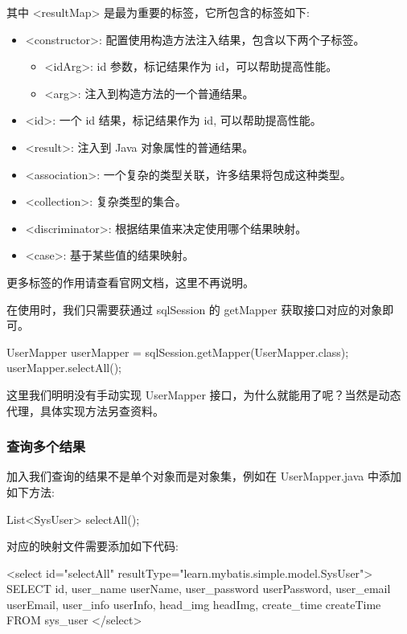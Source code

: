 其中 <resultMap> 是最为重要的标签，它所包含的标签如下:
\begin{itemize}
    \item <constructor>: 配置使用构造方法注入结果，包含以下两个子标签。
    \begin{itemize}
        \item <idArg>: id 参数，标记结果作为 id，可以帮助提高性能。
        \item <arg>: 注入到构造方法的一个普通结果。
    \end{itemize}
    \item <id>: 一个 id 结果，标记结果作为 id, 可以帮助提高性能。
    \item <result>: 注入到 Java 对象属性的普通结果。
    \item <association>: 一个复杂的类型关联，许多结果将包成这种类型。
    \item <collection>: 复杂类型的集合。
    \item <discriminator>: 根据结果值来决定使用哪个结果映射。
    \item <case>: 基于某些值的结果映射。
\end{itemize}

更多标签的作用请查看官网文档，这里不再说明。

在使用时，我们只需要获通过 sqlSession 的 getMapper 获取接口对应的对象即可。

\begin{Java}
UserMapper userMapper = sqlSession.getMapper(UserMapper.class);
userMapper.selectAll();
\end{Java}

这里我们明明没有手动实现 UserMapper 接口，为什么就能用了呢？当然是动态代理，具体实现方法另查资料。

\subsubsection*{查询多个结果}

加入我们查询的结果不是单个对象而是对象集，例如在 UserMapper.java 中添加如下方法:

\begin{Java}
List<SysUser> selectAll();
\end{Java}

对应的映射文件需要添加如下代码:

\begin{xml}
<select id="selectAll" resultType="learn.mybatis.simple.model.SysUser">
    SELECT id,
           user_name     userName,
           user_password userPassword,
           user_email    userEmail,
           user_info     userInfo,
           head_img      headImg,
           create_time   createTime
    FROM sys_user
</select>
\end{xml}

